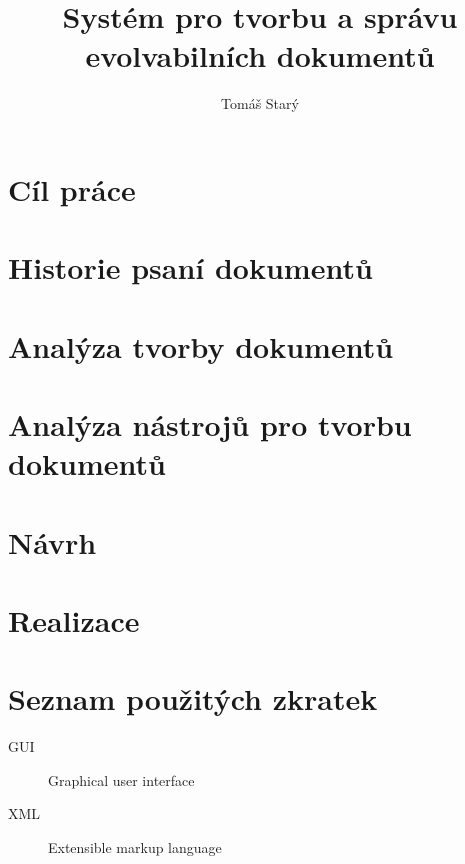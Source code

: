 \documentclass[thesis=B,czech]{FITthesis}[2012/06/26]
\title{Systém pro tvorbu a správu evolvabilních dokumentů}
\author{Tomáš Starý} %
\begin{document}

\begin{introduction}
	
\end{introduction}

\chapter{Cíl práce}


\chapter{Historie psaní dokumentů}


\chapter{Analýza tvorby dokumentů}


\chapter{Analýza nástrojů pro tvorbu dokumentů}


\chapter{Návrh}


\chapter{Realizace}

\begin{conclusion}
\end{conclusion}
\listoftodos
\printbibliography
\appendix

\chapter{Seznam použitých zkratek}
\begin{description}
	\item[GUI] Graphical user interface
	\item[XML] Extensible markup language
\end{description}
\end{document}
